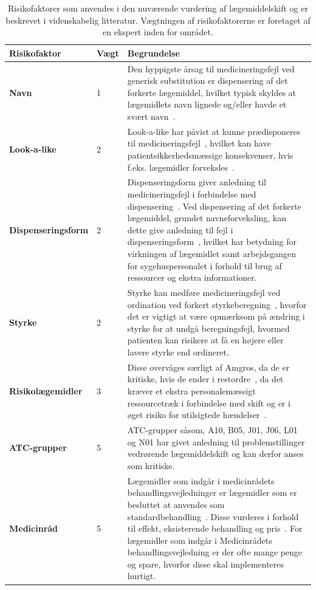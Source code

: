 \begin{longtable}{|p{3.5cm}|p{1.1cm}|p{9.2cm}|}
	\caption{Risikofaktorer som anvendes i den nuværende vurdering af lægemiddelskift og er beskrevet i videnskabelig litteratur. Vægtningen af risikofaktorerne er foretaget af en ekspert inden for området.} 
	\label{table:features} \\ \hline
\cellcolor[HTML]{C0C0C0} {\textbf{Risikofaktor}} & \cellcolor[HTML]{C0C0C0} {\textbf{Vægt}} & \cellcolor[HTML]{C0C0C0} {\textbf{Begrundelse}} \vspace{0.2cm} \\ \hline
\textbf{Navn} & 1 & Den hyppigste årsag til medicineringsfejl ved generisk substitution er dispensering af det forkerte lægemiddel, hvilket typisk skyldes at lægemidlets navn lignede og/eller havde et svært navn~\citep{Hakonsen2010}. \\  \hline 
\textbf{Look-a-like} & 2 & Look-a-like har påvist at kunne prædisponeres til medicineringsfejl~\citep{Wittich2014}, hvilket kan have patientsikkerhedsmæssige konsekvenser, hvis f.eks. lægemidler forveksles~\citep{DanskSelskabforPatientsikkerhed2009}.\\  \hline 
\textbf{Dispenseringsform} & 2 & Dispenseringsform giver anledning til medicineringsfejl i forbindelse med dispensering~\citep{Agrawal2009}. Ved dispensering af det forkerte lægemiddel, grundet navneforveksling, kan dette give anledning til fejl i dispenseringsform~\citep{DanskSelskabforPatientsikkerhed2009}, hvilket har betydning for virkningen af lægemidlet samt arbejdsgangen for sygehuspersonalet i forhold til brug af ressourcer og ekstra informationer.
\\ \hline 
\textbf{Styrke} & 2 & Styrke kan medføre medicineringsfejl ved ordination ved forkert styrkeberegning~\citep{Agrawal2009}, hvorfor det er vigtigt at være opmærksom på  ændring i styrke for at undgå beregningsfejl, hvormed patienten kan risikere at få en højere eller lavere styrke end ordineret.\\ \hline
\textbf{Risikolægemidler} & 3 & Disse overvåges særligt af Amgros, da de er kritiske, hvis de ender i restordre~\citep{Amgros}, da det kræver et ekstra personalemæssigt ressourcetræk i forbindelse med skift og er i øget risiko for utilsigtede hændelser~\citep{Amgros}. \\ \hline 
\textbf{ATC-grupper} & 5 & ATC-grupper såsom, A10, B05, J01, J06, L01 og N01 har givet anledning til problemstillinger vedrørende lægemiddelskift og  kan derfor anses som kritiske\citep{SRN}. \\ \hline 
\textbf{Medicinråd} & 5 & Lægemidler som indgår i medicinrådets behandlingsvejledninger er lægemidler som er besluttet at anvendes som standardbehandling~\citep{Medicinradet2018}. Disse vurderes i forhold til effekt, eksisterende behandling og pris~\citep{Medicinradet2018}. For lægemidler som indgår i Medicinrådets behandlingsvejledning er der ofte mange penge og spare, hvorfor disse skal implementeres hurtigt. \\ \hline 
    \end{longtable}

